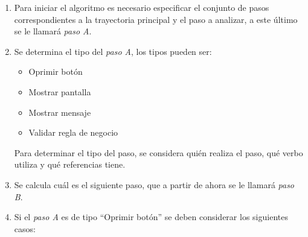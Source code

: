 	\begin{enumerate}
		\item Para iniciar el algoritmo es necesario especificar el conjunto de pasos correspondientes a la trayectoria principal y el paso a analizar, a este último se le llamará {\it paso A}.
		\item Se determina el tipo del {\it paso A}, los tipos pueden ser:
		\begin{itemize}
			\item Oprimir botón
			\item Mostrar pantalla
			\item Mostrar mensaje
			\item Validar regla de negocio
		\end{itemize}
		
		Para determinar el tipo del paso, se considera quién realiza el paso, qué verbo utiliza y qué referencias tiene.
		
		\item Se calcula cuál es el siguiente paso, que a partir de ahora se le llamará {\it paso B}.
		
		\item Si el {\it paso A} es de tipo ``Oprimir botón'' se deben considerar los siguientes casos:
		

\end{enumerate}

